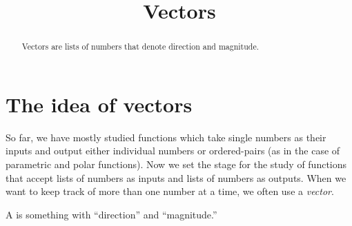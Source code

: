 \documentclass{ximera}
\title[Dig-In:]{Vectors}
\begin{document}
\begin{abstract}
  Vectors are lists of numbers that denote direction and magnitude.
\end{abstract}
\maketitle


\section{The idea of vectors}


So far, we have mostly studied functions which take single numbers as
their inputs and output either individual numbers or ordered-pairs (as
in the case of parametric and polar functions).  Now we set the stage
for the study of functions that accept lists of numbers as inputs and
lists of numbers as outputs. When we want to keep track of more than
one number at a time, we often use a \textit{vector}.

\begin{definition}
  A  is something with ``direction'' and ``magnitude.''
\end{definition}
\end{document}

